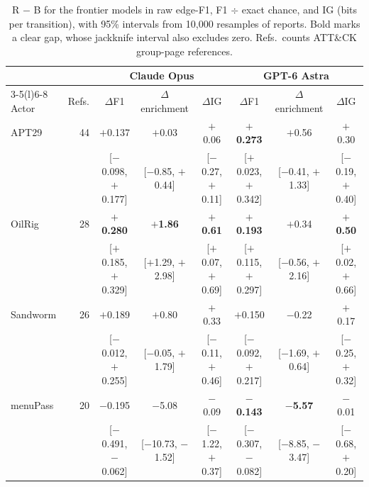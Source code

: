 \documentclass[letterpaper]{article} %
\begin{document}
\begin{table}[t]
\centering
\small
\setlength{\tabcolsep}{4pt}
\begin{tabular}{@{}lrcccccc@{}}
\toprule
 & & \multicolumn{3}{c}{Claude Opus} & \multicolumn{3}{c}{GPT-6 Astra} \\
\cmidrule(lr){3-5}\cmidrule(l){6-8}
Actor & Refs. & $\Delta$F1 & $\Delta$enrichment & $\Delta$IG & $\Delta$F1 & $\Delta$enrichment & $\Delta$IG \\
\midrule
APT29 & 44 & $+$0.137 & $+$0.03 & $+$0.06 & \textbf{$+$0.273} & $+$0.56 & $+$0.30 \\
 & & {\scriptsize [$-$0.098, $+$0.177]} & {\scriptsize [$-$0.85, $+$0.44]} & {\scriptsize [$-$0.27, $+$0.11]} & {\scriptsize [$+$0.023, $+$0.342]} & {\scriptsize [$-$0.41, $+$1.33]} & {\scriptsize [$-$0.19, $+$0.40]} \\
OilRig & 28 & \textbf{$+$0.280} & \textbf{$+$1.86} & \textbf{$+$0.61} & \textbf{$+$0.193} & $+$0.34 & \textbf{$+$0.50} \\
 & & {\scriptsize [$+$0.185, $+$0.329]} & {\scriptsize [$+$1.29, $+$2.98]} & {\scriptsize [$+$0.07, $+$0.69]} & {\scriptsize [$+$0.115, $+$0.297]} & {\scriptsize [$-$0.56, $+$2.16]} & {\scriptsize [$+$0.02, $+$0.66]} \\
Sandworm & 26 & $+$0.189 & $+$0.80 & $+$0.33 & $+$0.150 & $-$0.22 & $+$0.17 \\
 & & {\scriptsize [$-$0.012, $+$0.255]} & {\scriptsize [$-$0.05, $+$1.79]} & {\scriptsize [$-$0.11, $+$0.46]} & {\scriptsize [$-$0.092, $+$0.217]} & {\scriptsize [$-$1.69, $+$0.64]} & {\scriptsize [$-$0.25, $+$0.32]} \\
menuPass & 20 & $-$0.195 & $-$5.08 & $-$0.09 & \textbf{$-$0.143} & \textbf{$-$5.57} & $-$0.01 \\
 & & {\scriptsize [$-$0.491, $-$0.062]} & {\scriptsize [$-$10.73, $-$1.52]} & {\scriptsize [$-$1.22, $+$0.37]} & {\scriptsize [$-$0.307, $-$0.082]} & {\scriptsize [$-$8.85, $-$3.47]} & {\scriptsize [$-$0.68, $+$0.20]} \\
\bottomrule
\end{tabular}
\caption{R $-$ B for the frontier models in raw edge-F1, F1 $\div$ exact chance, and IG (bits per transition), with 95\% intervals from 10{,}000 resamples of reports. Bold marks a clear gap, whose jackknife interval also excludes zero. Refs.\ counts ATT\&CK group-page references.}
\label{tab:h2}
\end{table}
\end{document}

